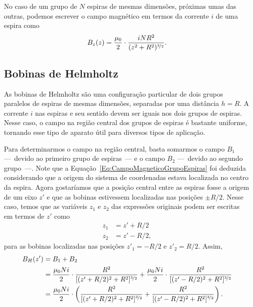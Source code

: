 No caso de um grupo de $N$ espiras de mesmas dimensões, próximas umas das outras, podemos escrever o campo magnético em termos da corrente $i$ de uma espira como
\begin{equation}\label{Eq:CampoMagneticoGrupoEspiras}
    B_z(z) = \frac{\mu_0}{2} \cdot \frac{iNR^2}{(z^2 + R^2)^{\nicefrac{3}{2}}}.
\end{equation}
    

\subsection{Bobinas de Helmholtz}

As bobinas de Helmholtz são uma configuração particular de dois grupos paralelos de espiras de mesmas dimensões, separadas por uma distância $h = R$. A corrente $i$ nas espiras e seu sentido  devem ser iguais nos dois grupos de espiras. Nesse caso, o campo na região central dos grupos de espiras é bastante uniforme, tornando esse tipo de aparato útil para diversos tipos de aplicação. 

Para determinarmos o campo na região central, basta somarmos o campo $B_1$ ---~devido ao primeiro grupo de espiras~--- e o campo $B_2$ ---~devido ao segundo grupo~---. Note que a Equação~\eqref{Eq:CampoMagneticoGrupoEspiras} foi deduzida considerando que a origem do sistema de coordenadas estava localizada no centro da espira. Agora gostaríamos que a posição central entre as espiras fosse a origem de um eixo $z'$ e que as bobinas estivessem localizadas nas posições $\pm R/2$. Nesse caso, temos que as variáveis $z_1$ e $z_2$ das expressões originais podem ser escritas em termos de $z'$ como
\begin{align}
    z_1 &= z' + R/2 \\
    z_2 &= z' - R/2,
\end{align}
%
para as bobinas localizadas nas posições $z'_1 = -R/2$ e $z'_2 = R/2$. Assim,
\begin{align}
    B_H(z') &= B_1 + B_2 \\
    &= \frac{\mu_0 N i}{2} \cdot \frac{R^2}{[(z' + R/2)^2 + R^2]^{\nicefrac{3}{2}}} + \frac{\mu_0 N i}{2} \cdot \frac{R^2}{[(z' - R/2)^2 + R^2]^{\nicefrac{3}{2}}} \\
    &= \frac{\mu_0 N i}{2} \cdot \left(\frac{R^2}{[(z' + R/2)^2 + R^2]^{\nicefrac{3}{2}}} + \frac{R^2}{[(z' - R/2)^2 + R^2]^{\nicefrac{3}{2}}}\right). \label{Eq:CampoMagneticoBobinasDeHelmholtz}
\end{align}

